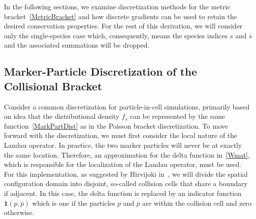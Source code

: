 \documentclass[preprint,12pt]{elsarticle}
\theoremstyle{definition}
\begin{document}
In the following sections, we examine discretization methods for the metric bracket~\eqref{MetricBracket} and how discrete gradients can be used to retain the desired conservation properties. For the rest of this derivation, we will consider only the single-species case which, consequently, means the species indices $s$ and $\bar{s}$ and the associated summations will be dropped.

\subsection{Marker-Particle Discretization of the Collisional Bracket}\label{sec:MetricBracketDiscretization}

Consider a common discretization for particle-in-cell simulations, primarily based on idea that the distributional density $f_s$ can be represented by the same function~\eqref{MarkPartDist} as in the Poisson bracket discretization.
To move forward with the discretization, we must first consider the local nature of the Landau operator. In practice, the two marker particles will never be at exactly the same location. Therefore, an approximation for the delta function in~\eqref{Wmat}, which is responsible for the localization of the Landau operator, must be used. For this implementation, as suggested by Hirvijoki in~\cite{Eero2020}, we will divide the spatial configuration domain into disjoint, so-called collision cells that share a boundary if adjacent. In this case, the delta function is replaced by an indicator function $\boldsymbol{1} (p, \overline{p})$ which is one if the particles $p$ and $\overline{p}$ are within the collision cell and zero otherwise.
\end{document}
